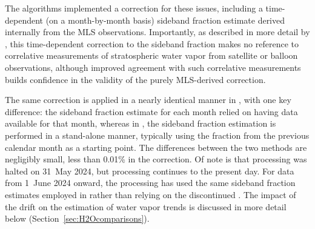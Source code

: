The \prevv algorithms implemented a correction for these issues, including a time-dependent (on a month-by-month basis) sideband fraction estimate derived internally from the MLS observations.  Importantly, as described in more detail by \citet{LiveseyEtal:2021:Drifts}, this time-dependent correction to the sideband fraction makes no reference to correlative measurements of stratospheric water vapor from satellite or balloon observations, although improved agreement with such correlative measurements builds confidence in the validity of the purely MLS-derived correction.

The same correction is applied in a nearly identical manner in \thisv, with one key difference: the \vv sideband fraction estimate for each month relied on having \viv data available for that month, whereas in \thisv, the sideband fraction estimation is performed in a stand-alone manner, typically using the fraction from the previous calendar month as a starting point.  The differences between the two methods are negligibly small, less than 0.01\% in the correction. Of note is that \viv processing was halted on 31~May 2024, but \vv processing continues to the present day. For data from 1~June 2024 onward, the \vv processing has used the same sideband fraction estimates employed in \vvi rather than relying on the discontinued \viv. The impact of the drift on the estimation of water vapor trends is discussed in more detail below (Section~\ref{sec:H2Ocomparisons}).

